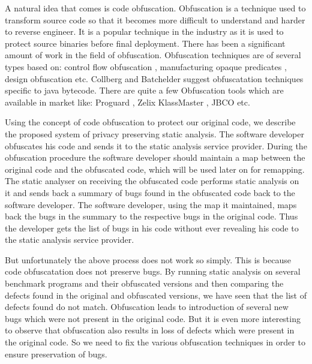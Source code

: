 \documentclass[conference]{IEEEtran}
\begin{document}
A natural idea that comes is code obfuscation. Obfuscation is a technique used to transform source code so that it becomes more difficult to understand 
and harder to reverse engineer. It is a popular technique in the industry as it is used to protect source binaries before final deployment. There has been a significant amount of work
in the field of obfuscation. Obfuscation techniques are of several types based on: control flow obfuscation \cite{controlflowobf}, manufacturing opaque predicates \cite{collberg}, 
design obfuscation \cite{designobf} etc. Collberg \cite{collberg} and Batchelder \cite{jbco} suggest obfuscatation techniques specific to java bytecode. There are quite a few 
Obfuscation tools which are available in market like: Proguard \cite{proguard}, Zelix KlassMaster \cite{zelix}, JBCO \cite{jbco}etc.

Using the concept of code obfuscation to protect our original code, we describe the proposed system of privacy preserving static analysis. The software developer obfuscates his code 
and sends it to the static analysis service provider. During the obfuscation procedure the software developer should maintain a map between the original code and the obfuscated code, 
which will be used later on for remapping. The static analyser on receiving the obfuscated code performs static analysis on it and sends back a summary of bugs found in the obfuscated 
code back to the software developer. The software developer, using the map it maintained, maps back the bugs in the summary to the respective bugs in the original code. Thus the 
developer gets the list of bugs in his code without ever revealing his code to the static analysis service provider.

But unfortunately the above process does not work so simply. This is because code obfuscatation does not preserve bugs. By running static analysis on several benchmark programs and 
their obfuscated versions and then comparing the defects found in the original and obfuscated versions, we have seen that the list of defects found do not match. Obfuscation leads to 
introduction of several new bugs which were not present in the original code. But it is even more interesting to observe that obfuscation also results in loss of defects which were 
present in the original code. So we need to fix the various obfuscation techniques in order to ensure preservation of bugs.
\end{document}
